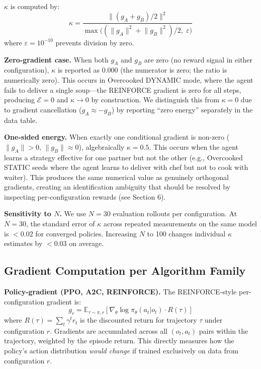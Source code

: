 \documentclass[letterpaper]{article}
\begin{document}
$\kappa$ is computed by:
\begin{equation}
\kappa = \frac{\lVert (g_A + g_B)/2 \rVert^2}{\max\bigl((\lVert g_A \rVert^2 + \lVert g_B \rVert^2)/2,\;\varepsilon\bigr)}
\end{equation}
where $\varepsilon = 10^{-10}$ prevents division by zero.

\medskip
\noindent\textbf{Zero-gradient case.}
When both $g_A$ and $g_B$ are zero (no reward signal in either configuration), $\kappa$ is reported as 0.000 (the numerator is zero; the ratio is numerically zero). This occurs in Overcooked DYNAMIC mode, where the agent fails to deliver a single soup---the REINFORCE gradient is zero for all steps, producing $\mathcal{E}=0$ and $\kappa\to 0$ by construction. We distinguish this from $\kappa=0$ due to gradient cancellation ($g_A \approx -g_B$) by reporting ``zero energy'' separately in the data table.

\medskip
\noindent\textbf{One-sided energy.}
When exactly one conditional gradient is non-zero ($\|g_A\|>0$, $\|g_B\|\approx 0$), algebraically $\kappa = 0.5$. This occurs when the agent learns a strategy effective for one partner but not the other (e.g., Overcooked STATIC seeds where the agent learns to deliver with chef but not to cook with waiter). This produces the same numerical value as genuinely orthogonal gradients, creating an identification ambiguity that should be resolved by inspecting per-configuration rewards (see Section 6).

\medskip
\noindent\textbf{Sensitivity to $N$.}
We use $N = 30$ evaluation rollouts per configuration.
At $N=30$, the standard error of $\kappa$ across repeated measurements on the same model is $<0.02$ for converged policies.
Increasing $N$ to 100 changes individual $\kappa$ estimates by $<0.03$ on average.

\subsection{Gradient Computation per Algorithm Family}

\noindent\textbf{Policy-gradient (PPO, A2C, REINFORCE).}
The REINFORCE-style per-configuration gradient is:
\begin{equation}
g_r = \mathbb{E}_{\tau \sim \pi, r}\!\left[ \nabla_\theta \log \pi_\theta(a_t|o_t) \cdot R(\tau) \right]
\end{equation}
where $R(\tau) = \sum_t \gamma^t r_t$ is the discounted return for trajectory $\tau$ under configuration $r$.
Gradients are accumulated across all $(o_t, a_t)$ pairs within the trajectory, weighted by the episode return.
This directly measures how the policy's action distribution \textit{would change} if trained exclusively on data from configuration $r$.
\end{document}

